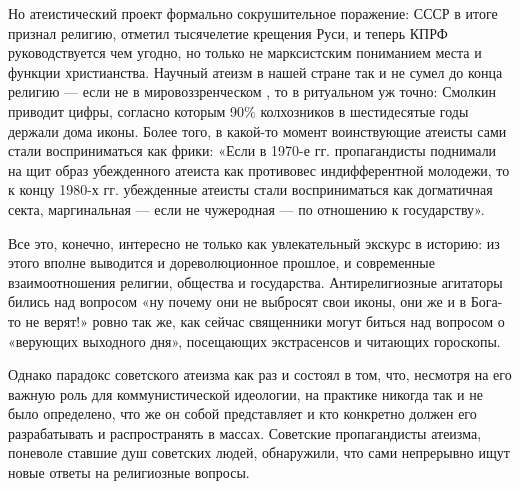 Но атеистический проект формально 
сокрушительное поражение:
СССР в итоге признал религию, отметил тысячелетие крещения Руси,
и теперь КПРФ руководствуется чем угодно, но только не марксистским
пониманием места и функции христианства.
Научный атеизм в нашей стране так и не сумел до конца  религию
--- если не в мировоззренческом ,
то в ритуальном уж точно:
Смолкин приводит цифры, согласно которым 90\% колхозников в шестидесятые годы
держали дома иконы.
Более того, в какой-то момент воинствующие атеисты сами стали восприниматься
как фрики: «Если в 1970-е гг. пропагандисты поднимали на щит образ
убежденного атеиста как противовес индифферентной молодежи,
то к концу 1980-х гг. убежденные атеисты стали восприниматься
как догматичная секта, маргинальная --- если не чужеродная ---
по отношению к государству».

Все это, конечно, интересно не только как увлекательный экскурс в историю:
из этого 
вполне выводится и дореволюционное прошлое, и современные взаимоотношения
религии, общества и государства.
Антирелигиозные агитаторы бились над вопросом
«ну почему они не выбросят свои иконы, они же и в Бога-то не верят!»
ровно так же, как сейчас священники могут биться над вопросом
о «верующих выходного дня», посещающих экстрасенсов и читающих гороскопы.

Однако парадокс советского атеизма как раз и состоял в том, что,
несмотря на его важную роль для коммунистической идеологии, на практике
никогда так и не было определено, что же он собой представляет и кто
конкретно должен его разрабатывать и распространять в массах.
Советские пропагандисты атеизма, поневоле ставшие
 душ советских людей,
обнаружили, что сами непрерывно ищут новые ответы на религиозные вопросы.


